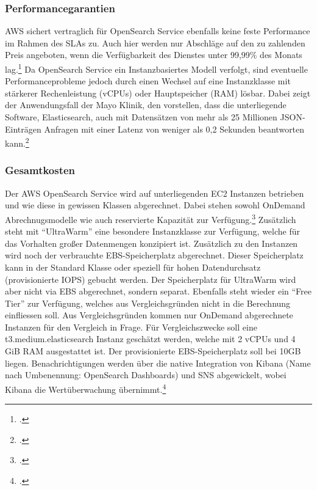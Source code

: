 \subsubsection{Performancegarantien}
\ac{AWS} sichert vertraglich für OpenSearch Service ebenfalls keine feste Performance im Rahmen des \acp{SLA} zu. Auch hier werden nur Abschläge auf den zu zahlenden Preis angeboten, wenn die Verfügbarkeit des Dienstes unter 99,99\% des Monats lag.\footcite[Vgl.][]{AmazonWebServicesInc..2019} Da OpenSearch Service ein Instanzbasiertes Modell verfolgt, sind eventuelle Performanceprobleme jedoch durch einen Wechsel auf eine Instanzklasse mit stärkerer Rechenleistung (vCPUs) oder Hauptspeicher (\ac{RAM}) lösbar. Dabei zeigt der Anwendungsfall der Mayo Klinik, den \citeauthor{Chen.2017} vorstellen, dass die unterliegende Software, Elasticsearch, auch mit Datensätzen von mehr als 25 Millionen \ac{JSON}-Einträgen Anfragen mit einer Latenz von weniger als 0,2 Sekunden beantworten kann.\footcite[Vgl.][]{Chen.2017}

\subsubsection{Gesamtkosten}
Der \ac{AWS} OpenSearch Service wird auf unterliegenden \ac{EC2} Instanzen betrieben und wie diese in gewissen Klassen abgerechnet. Dabei stehen sowohl OnDemand Abrechnugsmodelle wie auch reservierte Kapazität zur Verfügung.\footcite[Vgl. auch im Folgenden][]{AmazonWebServicesInc..o.J.w} Zusätzlich steht mit \enquote{UltraWarm} eine besondere Instanzklasse zur Verfügung, welche für das Vorhalten großer Datenmengen konzipiert ist. Zusätzlich zu den Instanzen wird noch der verbrauchte \ac{EBS}-Speicherplatz abgerechnet. Dieser Speicherplatz kann in der Standard Klasse oder speziell für hohen Datendurchsatz (provisionierte \ac{IOPS}) gebucht werden. Der Speicherplatz für UltraWarm wird aber nicht via \ac{EBS} abgerechnet, sondern separat. Ebenfalls steht wieder ein \enquote{Free Tier} zur Verfügung, welches aus Vergleichsgründen nicht in die Berechnung einfliessen soll. Aus Vergleichsgründen kommen nur OnDemand abgerechnete Instanzen für den Vergleich in Frage. Für Vergleichszwecke soll eine t3.medium.elasticsearch Instanz geschätzt werden, welche mit 2 vCPUs und 4 GiB \ac{RAM} ausgestattet ist. Der provisionierte \ac{EBS}-Speicherplatz soll bei 10GB liegen.
Benachrichtigungen werden über die native Integration von Kibana (Name nach Umbenennung: OpenSearch Dashboards) und \ac{SNS} abgewickelt, wobei Kibana die Wertüberwachung übernimmt.\footcite[Vgl.][]{AmazonWebServicesInc..o.J.x}


